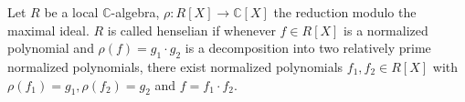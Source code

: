 Let $R$ be a local $\mathbb{C}$-algebra, $\rho: R[X] \to \mathbb{C}[X]$ the reduction modulo the maximal ideal. $R$ is called henselian if whenever $f \in R[X]$ is a normalized polynomial and $\rho(f) = g_1 \cdot g_2$ is a decomposition into two relatively prime normalized polynomials, there exist normalized polynomials $f_1, f_2 \in R[X]$ with $\rho(f_1) = g_1, \rho(f_2) = g_2$ and $f = f_1 \cdot f_2$.
